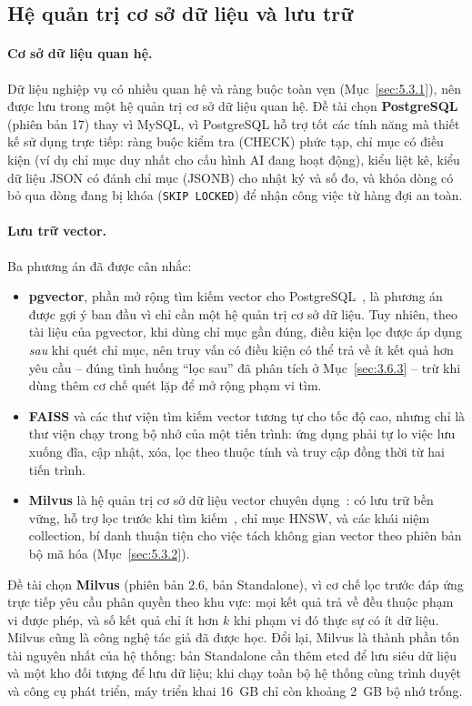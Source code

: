 \subsection{Hệ quản trị cơ sở dữ liệu và lưu trữ}
\label{sec:6.1.3}

\paragraph{Cơ sở dữ liệu quan hệ.} Dữ liệu nghiệp vụ có nhiều quan hệ và ràng buộc toàn vẹn (Mục~\ref{sec:5.3.1}), nên được lưu trong một hệ quản trị cơ sở dữ liệu quan hệ. Đề tài chọn \textbf{PostgreSQL} (phiên bản 17) thay vì MySQL, vì PostgreSQL hỗ trợ tốt các tính năng mà thiết kế sử dụng trực tiếp: ràng buộc kiểm tra (CHECK) phức tạp, chỉ mục có điều kiện (ví dụ chỉ mục duy nhất cho cấu hình AI đang hoạt động), kiểu liệt kê, kiểu dữ liệu JSON có đánh chỉ mục (JSONB) cho nhật ký và số đo, và khóa dòng có bỏ qua dòng đang bị khóa (\texttt{SKIP LOCKED}) để nhận công việc từ hàng đợi an toàn.

\paragraph{Lưu trữ vector.} Ba phương án đã được cân nhắc:
\begin{itemize}
    \item \textbf{pgvector}, phần mở rộng tìm kiếm vector cho PostgreSQL~\cite{pgvector2026}, là phương án được gợi ý ban đầu vì chỉ cần một hệ quản trị cơ sở dữ liệu. Tuy nhiên, theo tài liệu của pgvector, khi dùng chỉ mục gần đúng, điều kiện lọc được áp dụng \emph{sau} khi quét chỉ mục, nên truy vấn có điều kiện có thể trả về ít kết quả hơn yêu cầu -- đúng tình huống ``lọc sau'' đã phân tích ở Mục~\ref{sec:3.6.3} -- trừ khi dùng thêm cơ chế quét lặp để mở rộng phạm vi tìm.
    \item \textbf{FAISS} và các thư viện tìm kiếm vector tương tự cho tốc độ cao, nhưng chỉ là thư viện chạy trong bộ nhớ của một tiến trình: ứng dụng phải tự lo việc lưu xuống đĩa, cập nhật, xóa, lọc theo thuộc tính và truy cập đồng thời từ hai tiến trình.
    \item \textbf{Milvus} là hệ quản trị cơ sở dữ liệu vector chuyên dụng~\cite{wang2021milvus}: có lưu trữ bền vững, hỗ trợ lọc trước khi tìm kiếm~\cite{milvus2026filtered}, chỉ mục HNSW, và các khái niệm collection, bí danh thuận tiện cho việc tách không gian vector theo phiên bản bộ mã hóa (Mục~\ref{sec:5.3.2}).
\end{itemize}
Đề tài chọn \textbf{Milvus} (phiên bản 2.6, bản Standalone), vì cơ chế lọc trước đáp ứng trực tiếp yêu cầu phân quyền theo khu vực: mọi kết quả trả về đều thuộc phạm vi được phép, và số kết quả chỉ ít hơn $k$ khi phạm vi đó thực sự có ít dữ liệu. Milvus cũng là công nghệ tác giả đã được học. Đổi lại, Milvus là thành phần tốn tài nguyên nhất của hệ thống: bản Standalone cần thêm etcd để lưu siêu dữ liệu và một kho đối tượng để lưu dữ liệu; khi chạy toàn bộ hệ thống cùng trình duyệt và công cụ phát triển, máy triển khai 16~GB chỉ còn khoảng 2~GB bộ nhớ trống.

